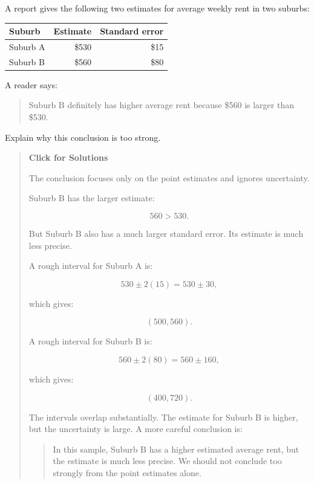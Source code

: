 \documentclass[
  letterpaper,
  DIV=11,
  numbers=noendperiod]{scrreprt}
\begin{document}
\begin{tcolorbox}[enhanced jigsaw, arc=.35mm, bottomrule=.15mm, bottomtitle=1mm, breakable, colback=white, colbacktitle=quarto-callout-note-color!10!white, colframe=quarto-callout-note-color-frame, coltitle=black, left=2mm, leftrule=.75mm, opacityback=0, opacitybacktitle=0.6, rightrule=.15mm, title=\textcolor{quarto-callout-note-color}{\faInfo}\hspace{0.5em}{Question 10}, titlerule=0mm, toprule=.15mm, toptitle=1mm]

A report gives the following two estimates for average weekly rent in
two suburbs:

\begin{table}
\fontsize{12.0pt}{14.0pt}\selectfont
\begin{tabular*}{\linewidth}{@{\extracolsep{\fill}}lrr}
\toprule
Suburb & Estimate & Standard error \\ 
\midrule\addlinespace[2.5pt]
Suburb A & \$530 & \$15 \\ 
Suburb B & \$560 & \$80 \\ 
\bottomrule
\end{tabular*}
\end{table}

A reader says:

\begin{quote}
Suburb B definitely has higher average rent because \$560 is larger than
\$530.
\end{quote}

Explain why this conclusion is too strong.

\begin{quote}
\textbf{Click for Solutions}

The conclusion focuses only on the point estimates and ignores
uncertainty.

Suburb B has the larger estimate:

\[
560 > 530.
\]

But Suburb B also has a much larger standard error. Its estimate is much
less precise.

A rough interval for Suburb A is:

\[
530 \pm 2(15)
=
530 \pm 30,
\]

which gives:

\[
(500,
560).
\]

A rough interval for Suburb B is:

\[
560 \pm 2(80)
=
560 \pm 160,
\]

which gives:

\[
(400,
720).
\]

The intervals overlap substantially. The estimate for Suburb B is
higher, but the uncertainty is large. A more careful conclusion is:

\begin{quote}
In this sample, Suburb B has a higher estimated average rent, but the
estimate is much less precise. We should not conclude too strongly from
the point estimates alone.
\end{quote}
\end{quote}

\end{tcolorbox}
\end{document}
